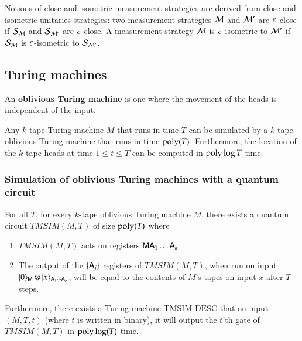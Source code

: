 Notions of close and isometric measurement strategies are derived from close and isometric unitaries strategies: two measurement strategies $\mathcal M$ and $\mathcal M'$ are $\varepsilon$-close if $\mathcal{S}_{\mathcal M}$ and $\mathcal{S}_{\mathcal M'}$ are $\varepsilon$-close. A measurement strategy $\mathcal M$ is $\varepsilon$-isometric to $\mathcal M'$ if $\mathcal{S}_{\mathcal M}$ is $\varepsilon$-isometric to $\mathcal{S}_{\mathcal M'}$.  


\subsection{Turing machines}
\label{sec:turing_machines}

An \textbf{oblivious Turing machine} is one where the movement of the heads is independent of the input.

\begin{theorem}\label{thm:pippenger}
Any $k$-tape Turing machine $M$ that runs in time $T$ can be simulated by a $k$-tape oblivious Turing machine that runs in time $\operatorname{poly}(T)$. Furthermore, the location of the $k$ tape heads at time $1 \leq t \leq T$ can be computed in $\operatorname{poly} \log T$ time.
\end{theorem}


\subsubsection{Simulation of oblivious Turing machines with a quantum circuit}

\begin{lemma}\label{lem:tmsim}
	For all $T$, for every $k$-tape oblivious Turing machine $M$, there exists a quantum circuit $TMSIM(M,T)$ of size $\operatorname{poly}(T)$ where
	\begin{enumerate}
		\item $TMSIM(M,T)$ acts on registers ${\mathsf{M}} {\mathsf{A}}_1 \ldots {\mathsf{A}}_k$
		\item The output of the $\{{\mathsf{A}}_j\}$ registers of $TMSIM(M,T)$, when run on input $|0\rangle_{{\mathsf{M}}} \otimes |x\rangle_{{\mathsf{A}}_1 \cdots {\mathsf{A}}_k}$, will be equal to the contents of $M$'s tapes on input $x$ after $T$ steps.
	\end{enumerate}
	Furthermore, there exists a Turing machine $\text{TMSIM-DESC}$ that on input $(M,T,t)$ (where $t$ is written in binary), it will output the $t$'th gate of $TMSIM(M,T)$ in $\operatorname{poly}\log(T)$ time. 
\end{lemma}

